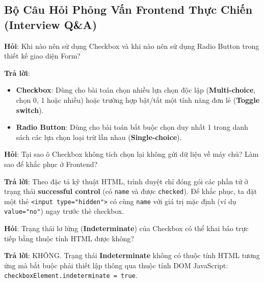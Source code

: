 \documentclass[11pt,oneside]{book}
\newcommand{\codeinline}[1]{\textcolor{accentOrange}{\texttt{#1}}}
\newcommand{\term}[1]{\textbf{\textcolor{primaryBlue}{#1}}}
\begin{document}
\subsection{Bộ Câu Hỏi Phỏng Vấn Frontend Thực Chiến (Interview Q\&A)}

\begin{noteBox}
\textbf{Hỏi}: Khi nào nên sử dụng Checkbox và khi nào nên sử dụng Radio Button trong thiết kế giao diện Form?
\par\vspace{3pt}
\textbf{Trả lời}:
\begin{itemize}[leftmargin=1.5em, itemsep=2pt, parsep=0pt]
    \item \textbf{Checkbox}: Dùng cho bài toán chọn nhiều lựa chọn độc lập (\term{Multi-choice}, chọn 0, 1 hoặc nhiều) hoặc trường hợp bật/tắt một tính năng đơn lẻ (\term{Toggle switch}).
    \item \textbf{Radio Button}: Dùng cho bài toán bắt buộc chọn duy nhất 1 trong danh sách các lựa chọn loại trừ lẫn nhau (\term{Single-choice}).
\end{itemize}
\end{noteBox}

\begin{noteBox}
\textbf{Hỏi}: Tại sao ô Checkbox không tích chọn lại không gửi dữ liệu về máy chủ? Làm sao để khắc phục ở Frontend?
\par\vspace{3pt}
\textbf{Trả lời}: Theo đặc tả kỹ thuật HTML, trình duyệt chỉ đóng gói các phần tử ở trạng thái \term{successful control} (có \codeinline{name} và được \codeinline{checked}). Để khắc phục, ta đặt một thẻ \codeinline{<input type="hidden">} có cùng \codeinline{name} với giá trị mặc định (ví dụ \codeinline{value="no"}) ngay trước thẻ checkbox.
\end{noteBox}

\begin{noteBox}
\textbf{Hỏi}: Trạng thái lơ lửng (\term{Indeterminate}) của Checkbox có thể khai báo trực tiếp bằng thuộc tính HTML được không?
\par\vspace{3pt}
\textbf{Trả lời}: KHÔNG. Trạng thái \term{Indeterminate} không có thuộc tính HTML tương ứng mà bắt buộc phải thiết lập thông qua thuộc tính DOM JavaScript: \codeinline{checkboxElement.indeterminate = true}.
\end{noteBox}
\end{document}
